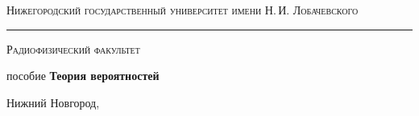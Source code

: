\begin{titlepage}

\begin{center}

{\small\textsc{Нижегородский государственный университет имени Н.\,И. Лобачевского}}
\vskip 1pt \hrule \vskip 3pt
{\small\textsc{Радиофизический факультет}}

\vfill

{  пособие \vskip 12pt\bfseries \Huge Теория вероятностей}
	
\end{center}

\vfill
	
	
\vfill
	
\begin{center}
	Нижний Новгород, \the\year
\end{center}

\end{titlepage}

